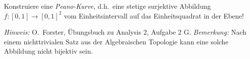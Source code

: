 \begin{prob}
Konstruiere eine {\it Peano-Kurve}, d.h.~eine stetige surjektive
Abbildung $f:[0,1]\to[0,1]^2$ vom Einheitsintervall auf das
Einheitsquadrat in der Ebene! 

{\it Hinweis: }  
  O.~Forster, \"Ubungsbuch zu Analysis 2, Aufgabe 2 G. {\it Bemerkung:
  }Nach einem nichttrivialen Satz aus der Algebraischen Topologie kann eine
  solche Abbildung nicht bijektiv sein. 
\end{prob}
